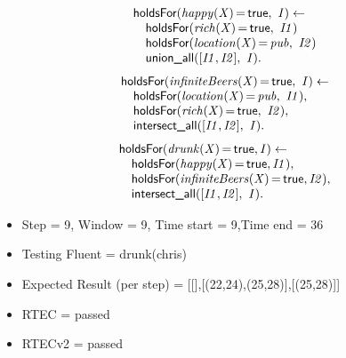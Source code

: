 \documentclass[8pt]{beamer}
\DeclareMathOperator{\val}{=}  %
\def \patsize {}
\def\holdsFor{\textsf{\patsize holdsFor}}
\def\unionall{\textsf{\patsize union\_all}}
\def\intersectall{\textsf{\patsize intersect\_all}}
\def\true{\textsf{\patsize true}}
\newenvironment{mysplit}%
  {\arraycolsep 0pt \begin{array}{l}}%
  {\end{array}}
\begin{document}
\begin{frame}
\begin{minipage}{0.48\linewidth}
        \begin{align*}
            \begin{mysplit}
                \holdsFor\mathit{(happy(X)\val\true,\ I) \leftarrow}\\
                \quad    \holdsFor\mathit{(rich(X)\val\true,\ I1)}\\
                \quad    \holdsFor\mathit{(location(X)\val pub,\ I2)}\\
                \quad    \unionall\mathit{([I1,I2],\ I)}.
            \end{mysplit}
        \end{align*}
        \begin{align*}
            \begin{mysplit}
                \holdsFor\mathit{(infiniteBeers(X)\val\true,\ I) \leftarrow}\\
                \quad    \holdsFor\mathit{(location(X)\val pub,\ I1),}\\
                \quad    \holdsFor\mathit{(rich(X)\val\true,\ I2),}\\
                \quad    \intersectall\mathit{([I1,I2],\ I).}\\
            \end{mysplit}
        \end{align*}
        \begin{align*}
            \begin{mysplit}
                \holdsFor\mathit{(drunk(X)\val\true,I) \leftarrow}\\
                \quad    \holdsFor\mathit{(happy(X)\val\true,I1),}\\
                \quad    \holdsFor\mathit{(infiniteBeers(X)\val\true,I2),}\\
                \quad    \intersectall\mathit{([I1,I2],\ I).}\\
            \end{mysplit}
        \end{align*}
    \end{minipage}

    \begin{itemize}
        \item Step = 9, Window = 9, Time start = 9,Time end = 36
        \item Testing Fluent = drunk(chris) 
        \item Expected Result (per step) = [[],[(22,24),(25,28)],[(25,28)]]
        \item RTEC = passed
        \item RTECv2 = passed
    \end{itemize}
\end{frame}
\end{document}
